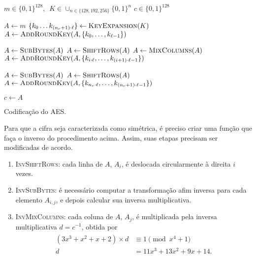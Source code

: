 \documentclass{ufsctex/ufsctex}
\newcommand{\binwds}[1]{\{0, 1\}^{#1}}
\begin{document}
\begin{algorithm}
  \begin{algorithmic}
    \REQUIRE{}  $m \in \binwds{128}, \enspace
      K \in \cup_{n \in \{128, 192, 256\}} \binwds{n}$
    \ENSURE{}  $c \in \binwds{128}$ 

    \STATE{}  $A \leftarrow m$
    \STATE{}  $\{k_{0} \dots k_{(n_{r} + 1) \cdot \ell}\}
      \leftarrow \textsc{KeyExpansion}(K)$
    \STATE{}  $A \leftarrow \textsc{AddRoundKey}(A,
      \{k_{0}, \dots, k_{\ell - 1}\})$

      \STATE{}  $A \leftarrow \textsc{SubBytes}(A)$
      \STATE{}  $A \leftarrow \textsc{ShiftRows}(A)$
      \STATE{}  $A \leftarrow \textsc{MixColumns}(A)$
      \STATE{}  $A \leftarrow \textsc{AddRoundKey}(A,
        \{k_{i \cdot \ell}, \dots, k_{(i + 1) \cdot \ell - 1}\})$
    \ENDFOR{}

    \STATE{}  $A \leftarrow \textsc{SubBytes}(A)$
    \STATE{}  $A \leftarrow \textsc{ShiftRows}(A)$
    \STATE{}  $A \leftarrow \textsc{AddRoundKey}(A,
      \{k_{n_{r} \cdot \ell}, \dots, k_{(n_{r} + 1) \cdot \ell - 1}\})$

    \STATE{}  $c \leftarrow A$
  \end{algorithmic}
  \caption{Codificação do AES.}\label{alg:aesencrypt}
\end{algorithm}

Para que a cifra seja caracterizada como simétrica, é preciso criar uma função
que faça o inverso do procedimento acima. Assim, suas etapas precisam ser
modificadas de acordo.

\begin{enumerate}[labelsep=0.5em, label=\roman*.]

  \item \textsc{InvShiftRows}: cada linha de $A$, $A_{i}$, é deslocada
      circularmente à direita $i$ vezes.

  \item \textsc{InvSubBytes}: é necessário computar a transformação afim
      inversa para cada elemento $A_{i, j}$, e depois calcular sua inversa
        multiplicativa.

  \item \textsc{InvMixColumns}: cada coluna de $A$, $A_{j}$, é multiplicada pela
      inversa multiplicativa $d = c^{-1}$, obtida por
        \begin{align}
          \begin{split}
            (3 x^{3} + x^{2} + x + 2) \times d &\equiv 1 \pmod{x^{4} + 1} \\
            d &= 11 x^{3} + 13 x^{2} + 9 x + 14.
          \end{split}
        \end{align}

\end{enumerate}
\end{document}
